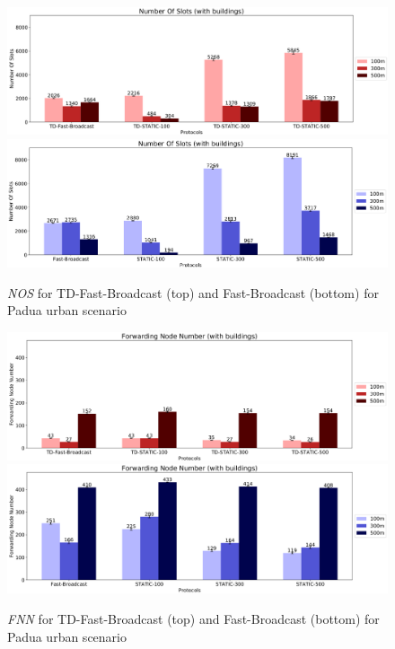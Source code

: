 		\begin{figure}[H]
			\centering
			\includegraphics[width=1.0\textwidth]{immagini/td-fb-pd/td-fb/nos}	
			\includegraphics[width=1.0\textwidth]{immagini/td-fb-pd/fb/nos}
			\caption{\textit{NOS} for TD-Fast-Broadcast (top) and Fast-Broadcast (bottom) for Padua urban scenario}
			\label{fig:td-nos}
		\end{figure}
		
		\begin{figure}[H]
			\centering
			\includegraphics[width=1.0\textwidth]{immagini/td-fb-pd/td-fb/fnn}	
			\includegraphics[width=1.0\textwidth]{immagini/td-fb-pd/fb/fnn}
			\caption{\textit{FNN} for TD-Fast-Broadcast (top) and Fast-Broadcast (bottom) for Padua urban scenario}
			\label{fig:td-fnn}
		\end{figure}


